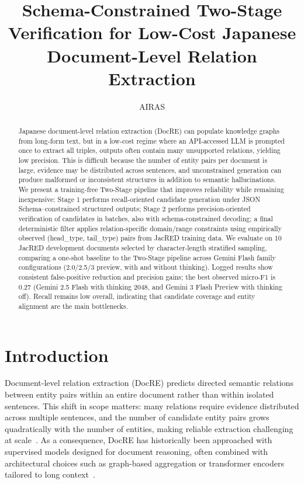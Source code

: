\documentclass{article} %
\title{Schema-Constrained Two-Stage Verification for Low-Cost Japanese Document-Level Relation Extraction}
\author{AIRAS}
\begin{document}
\maketitle

\begin{abstract}
Japanese document-level relation extraction (DocRE) can populate knowledge graphs from long-form text, but in a low-cost regime where an API-accessed LLM is prompted once to extract all triples, outputs often contain many unsupported relations, yielding low precision. This is difficult because the number of entity pairs per document is large, evidence may be distributed across sentences, and unconstrained generation can produce malformed or inconsistent structures in addition to semantic hallucinations. We present a training-free Two-Stage pipeline that improves reliability while remaining inexpensive: Stage 1 performs recall-oriented candidate generation under JSON Schema–constrained structured outputs; Stage 2 performs precision-oriented verification of candidates in batches, also with schema-constrained decoding; a final deterministic filter applies relation-specific domain/range constraints using empirically observed (head\_type, tail\_type) pairs from JacRED training data. We evaluate on 10 JacRED development documents selected by character-length stratified sampling, comparing a one-shot baseline to the Two-Stage pipeline across Gemini Flash family configurations (2.0/2.5/3 preview, with and without thinking). Logged results show consistent false-positive reduction and precision gains; the best observed micro-F1 is 0.27 (Gemini 2.5 Flash with thinking 2048, and Gemini 3 Flash Preview with thinking off). Recall remains low overall, indicating that candidate coverage and entity alignment are the main bottlenecks.
\end{abstract}

\section{Introduction}\label{sec:intro}
Document-level relation extraction (DocRE) predicts directed semantic relations between entity pairs within an entire document rather than within isolated sentences. This shift in scope matters: many relations require evidence distributed across multiple sentences, and the number of candidate entity pairs grows quadratically with the number of entities, making reliable extraction challenging at scale~\cite{yao-2019-docred}. As a consequence, DocRE has historically been approached with supervised models designed for document reasoning, often combined with architectural choices such as graph-based aggregation or transformer encoders tailored to long context~\cite{delaunay-2023-comprehensive}.
\end{document}
